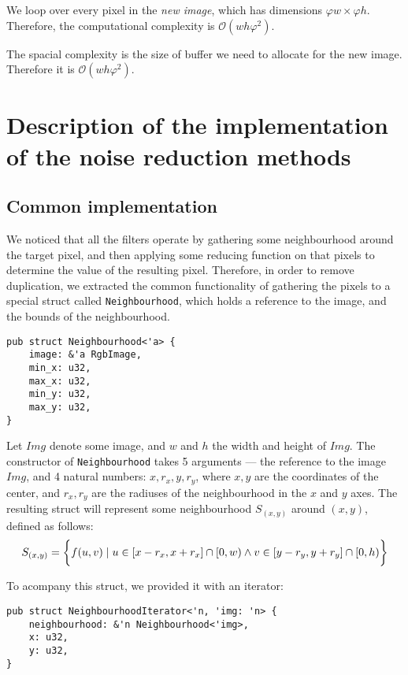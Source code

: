 \documentclass[12pt]{article}
\begin{document}
We loop over every pixel in the \emph{new image}, which has dimensions $\varphi w \times \varphi h$.
Therefore, the computational complexity is $\mathcal{O}(wh \varphi^2)$.

The spacial complexity is the size of buffer we need to allocate for the new image. Therefore it is $\mathcal{O}(wh \varphi^2)$.

\pagebreak
\section{Description of the implementation of the noise reduction methods}

\subsection*{Common implementation}
We noticed that all the filters operate by gathering some neighbourhood around the target pixel,
and then applying some reducing function on that pixels to determine the value of the resulting pixel.
Therefore, in order to remove duplication, we extracted the common functionality
of gathering the pixels to a special struct called \lstinline{Neighbourhood}, which holds a reference to the image, and the bounds of the neighbourhood.

\begin{lstlisting}
pub struct Neighbourhood<'a> {
    image: &'a RgbImage,
    min_x: u32,
    max_x: u32,
    min_y: u32,
    max_y: u32,
}
\end{lstlisting}

Let $Img$ denote some image, and $w$ and $h$ the width and height of $Img$.
The constructor of \lstinline{Neighbourhood} takes 5 arguments --- the reference to the image $Img$, and 4 natural numbers: $x,r_x,y,r_y$,
where $x,y$ are the coordinates of the center, and $r_x, r_y$ are the radiuses of the neighbourhood in the $x$ and $y$ axes.
The resulting struct will represent some neighbourhood $S_{(x,y)}$ around $(x,y)$, defined as follows:
\begin{equation}
    S_{(x,y)} =
    \\\bigg\{
    f(u,v) \mid u \in [x-r_x,x+r_x] \cap [0,w) \land v \in [y-r_y, y+r_y] \cap [0,h)
    \bigg\}
\end{equation}

To acompany this struct, we provided it with an iterator:

\begin{lstlisting}
pub struct NeighbourhoodIterator<'n, 'img: 'n> {
    neighbourhood: &'n Neighbourhood<'img>,
    x: u32,
    y: u32,
}
\end{lstlisting}
\end{document}
